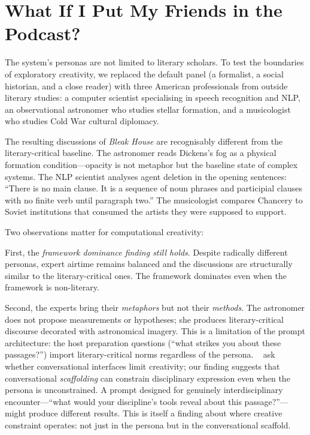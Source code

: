 \documentclass[letterpaper]{article}
\begin{document}
\section{What If I Put My Friends in the Podcast?}

The system's personas are not limited to literary scholars.  To test
the boundaries of exploratory creativity, we replaced the default
panel (a formalist, a social historian, and a close reader) with three
American professionals from outside literary studies: a computer
scientist specialising in speech recognition and NLP, an
observational astronomer who studies stellar formation, and a
musicologist who studies Cold War cultural diplomacy.

The resulting discussions of \emph{Bleak House} are recognisably
different from the literary-critical baseline.  The astronomer reads
Dickens's fog as a physical formation condition---opacity is not
metaphor but the baseline state of complex systems.  The NLP
scientist analyses agent deletion in the opening sentences: ``There is
no main clause.  It is a sequence of noun phrases and participial
clauses with no finite verb until paragraph two.''  The musicologist
compares Chancery to Soviet institutions that consumed the artists
they were supposed to support.

Two observations matter for computational creativity:

First, the \emph{framework dominance finding still holds}.  Despite radically
different personas, expert airtime remains balanced and the
discussions are structurally similar to the literary-critical ones.
The framework dominates even when the framework is non-literary.

Second, the experts bring their \emph{metaphors} but not their
\emph{methods}.  The astronomer does not propose measurements or
hypotheses; she produces literary-critical discourse decorated with
astronomical imagery.  This is a limitation of the prompt
architecture: the host preparation questions (``what strikes you
about these passages?'') import literary-critical norms regardless
of the persona.
\citeauthor{sood2025conversational}~
ask whether conversational interfaces limit creativity; our finding
suggests that conversational \emph{scaffolding} can constrain
disciplinary expression even when the persona is unconstrained.
A prompt designed for genuinely interdisciplinary
encounter---``what would your discipline's tools reveal about this
passage?''---might produce different results.  This is itself a
finding about where creative constraint operates: not just in the
persona but in the conversational scaffold.
\end{document}
